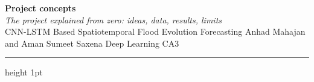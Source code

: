 \documentclass[9pt,a4paper]{extarticle}
\begin{document}
\begin{center}
{\fontsize{20}{24}\selectfont\bfseries\color{maroon} Project concepts}\\[2pt]
{\normalsize\itshape The project explained from zero: ideas, data, results, limits}\\[2pt]
{\footnotesize CNN-LSTM Based Spatiotemporal Flood Evolution Forecasting \textperiodcentered{} Anhad Mahajan and Aman Sumeet Saxena \textperiodcentered{} Deep Learning CA3}
\end{center}
{\color{maroon}\hrule height 1pt}\vspace{3pt}
\setcounter{section}{0}



\end{document}
